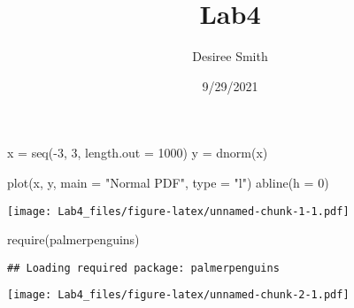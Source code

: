 \documentclass[
]{article}
\title{Lab4}
\author{Desiree Smith}
\date{9/29/2021}
\newenvironment{Shaded}{\begin{snugshade}}{\end{snugshade}}
\newcommand{\AttributeTok}[1]{\textcolor[rgb]{0.77,0.63,0.00}{#1}}
\newcommand{\CommentTok}[1]{\textcolor[rgb]{0.56,0.35,0.01}{\textit{#1}}}
\newcommand{\ConstantTok}[1]{\textcolor[rgb]{0.00,0.00,0.00}{#1}}
\newcommand{\DecValTok}[1]{\textcolor[rgb]{0.00,0.00,0.81}{#1}}
\newcommand{\FunctionTok}[1]{\textcolor[rgb]{0.00,0.00,0.00}{#1}}
\newcommand{\NormalTok}[1]{#1}
\newcommand{\OtherTok}[1]{\textcolor[rgb]{0.56,0.35,0.01}{#1}}
\newcommand{\SpecialCharTok}[1]{\textcolor[rgb]{0.00,0.00,0.00}{#1}}
\newcommand{\StringTok}[1]{\textcolor[rgb]{0.31,0.60,0.02}{#1}}
\begin{document}
\maketitle

\begin{Shaded}
\begin{Highlighting}[]
\NormalTok{x }\OtherTok{=} \FunctionTok{seq}\NormalTok{(}\SpecialCharTok{{-}}\DecValTok{3}\NormalTok{, }\DecValTok{3}\NormalTok{, }\AttributeTok{length.out =} \DecValTok{1000}\NormalTok{)}
\NormalTok{y }\OtherTok{=} \FunctionTok{dnorm}\NormalTok{(x)}

\FunctionTok{plot}\NormalTok{(x, y, }\AttributeTok{main =} \StringTok{"Normal PDF"}\NormalTok{, }\AttributeTok{type =} \StringTok{"l"}\NormalTok{)}
\FunctionTok{abline}\NormalTok{(}\AttributeTok{h =} \DecValTok{0}\NormalTok{)}
\end{Highlighting}
\end{Shaded}

\texttt{[image: Lab4\_files/figure-latex/unnamed-chunk-1-1.pdf]}

\begin{Shaded}
\begin{Highlighting}[]
\FunctionTok{require}\NormalTok{(palmerpenguins)}
\end{Highlighting}
\end{Shaded}

\begin{verbatim}
## Loading required package: palmerpenguins
\end{verbatim}

\begin{Shaded}
\end{Shaded}

\texttt{[image: Lab4\_files/figure-latex/unnamed-chunk-2-1.pdf]}

\begin{Shaded}
\end{Shaded}
\end{document}

